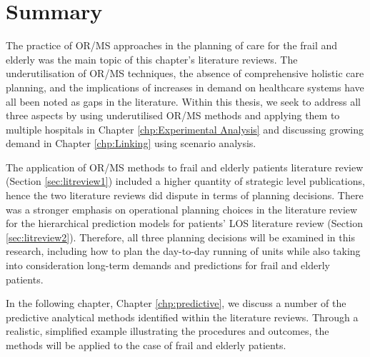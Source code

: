\documentclass[../thesis.tex]{subfiles}
\begin{document}
\section{Summary}\label{sec:litreviewsum}
The practice of OR/MS approaches in the planning of care for the frail and elderly was the main topic of this chapter's literature reviews. The underutilisation of OR/MS techniques, the absence of comprehensive holistic care planning, and the implications of increases in demand on healthcare systems have all been noted as gaps in the literature. Within this thesis, we seek to address all three aspects by using underutilised OR/MS methods and applying them to multiple hospitals in Chapter \ref{chp:Experimental Analysis} and discussing growing demand in Chapter \ref{chp:Linking} using scenario analysis.

The application of OR/MS methods to frail and elderly patients literature review (Section \ref{sec:litreview1}) included a higher quantity of strategic level publications, hence the two literature reviews did dispute in terms of planning decisions. There was a stronger emphasis on operational planning choices in the literature review for the hierarchical prediction models for patients' LOS literature review (Section \ref{sec:litreview2}). Therefore, all three planning decisions will be examined in this research, including how to plan the day-to-day running of units while also taking into consideration long-term demands and predictions for frail and elderly patients.

In the following chapter, Chapter \ref{chp:predictive}, we discuss a number of the predictive analytical methods identified within the literature reviews. Through a realistic, simplified example illustrating the procedures and outcomes, the methods will be applied to the case of frail and elderly patients. 
\end{document}
